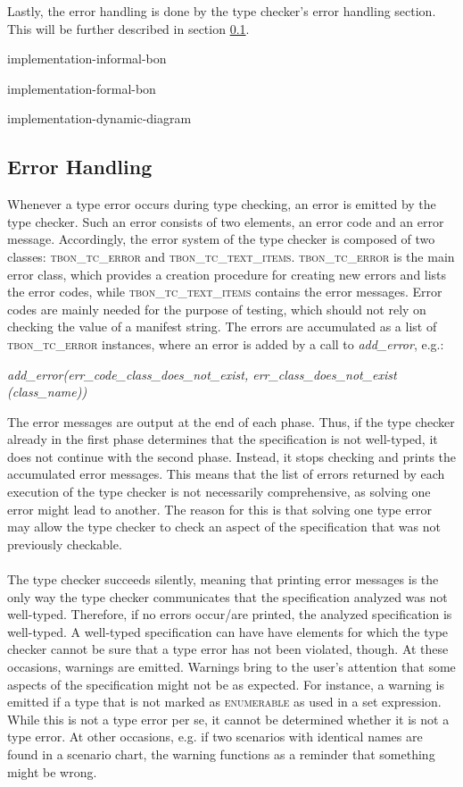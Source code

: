 Lastly, the error handling is done by the type checker's error handling section. This will be further described in section \ref{implementation-error-handling}.

{implementation-informal-bon}

{implementation-formal-bon}

{implementation-dynamic-diagram}

\subsection{Error Handling}
\label{implementation-error-handling}
Whenever a type error occurs during type checking, an error is emitted by the type checker. Such an error consists of two elements, an error code and an error message. Accordingly, the error system of the type checker is composed of two classes: \textsc{tbon\_tc\_error} and \textsc{tbon\_tc\_text\_items}. \textsc{tbon\_tc\_error} is the main error class, which provides a creation procedure for creating new errors and lists the error codes, while \textsc{tbon\_tc\_text\_items} contains the error messages. Error codes are mainly needed for the purpose of testing, which should not rely on checking the value of a manifest string. The errors are accumulated as a list of  \textsc{tbon\_tc\_error} instances, where an error is added by a call to \textit{add\_error}, e.g.: 
{\footnotesize
\begin{center}
\textit{add\_error(err\_code\_class\_does\_not\_exist, err\_class\_does\_not\_exist (class\_name))}
\end{center}}
The error messages are output at the end of each phase. Thus, if the type checker already in the first phase determines that the specification is not well-typed, it does not continue with the second phase. Instead, it stops checking and prints the accumulated error messages. This means that the list of errors returned by each execution of the type checker is not necessarily comprehensive, as solving one error might lead to another. The reason for this is that solving one type error may allow the type checker to check an aspect of the specification that was not previously checkable.
\paragraph{}
The type checker succeeds silently, meaning that printing error messages is the only way the type checker communicates that the specification analyzed was not well-typed. Therefore, if no errors occur/are printed, the analyzed specification is well-typed. A well-typed specification can have have elements for which the type checker cannot be sure that a type error has not been violated, though. At these occasions, warnings are emitted. Warnings bring to the user's attention that some aspects of the specification might not be as expected. For instance, a warning is emitted if a type that is not marked as \textsc{enumerable} as used in a set expression. While this is not a type error per se, it cannot be determined whether it is not a type error. At other occasions, e.g. if two scenarios with identical names are found in a scenario chart, the warning functions as a reminder that something might be wrong.

